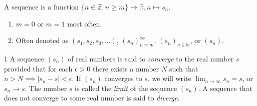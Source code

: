 \begin{defn}{1}
	A sequence is a function $\{n\in\mathbb{Z}:n\geq m\} \rightarrow \mathbb{R},n\mapsto s_n$.
	\begin{enumerate}
		\item $m=0$ or $m=1$ most often.
		\item Often denoted as $(s_1,s_2,s_3,\dots)$, $(s_n)_{n=m}^\infty$, $(s_n)_{n\in\mathbb{N}}$, or $(s_n)$.		
	\end{enumerate}
\end{defn}

\begin{defn}{1}
	A sequence $(s_n)$ of real numbers is said to \textit{converge} to the real number $s$ provided that for each $\epsilon > 0$ there exists a number $N$	such that $n > N \implies |s_n-s|<\epsilon$. If $(s_n)$ converges to $s$, we will write $\lim_{n\rightarrow\infty} s_n = s$, or $s_n \rightarrow s$. The	number $s$ is called the \textit{limit} of the sequence $(s_n)$. A sequence that does not converge to some real number is said to \textit{diverge}.
\end{defn}

\newpage

